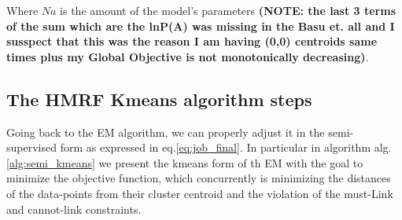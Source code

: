 \documentclass[dvips,dvipdfm,pdftex]{llncs}
\begin{document}
Where $\mathit{Na}$ is the amount of the model's parameters \textbf{(NOTE: the last 3 terms of the sum which are the lnP(A) was missing in the Basu et. all and I susspect that this was the reason I am having (0,0) centroids same times plus my Global Objective is not monotonically decreasing)}.

\subsection{The HMRF Kmeans algorithm steps}

Going back to the EM algorithm, we can properly adjust it in the semi-supervised form as expressed in eq.\ref{eq:job_final}. In particular in algorithm alg.\ref{alg:semi_kmeans} we present the kmeans form of th EM with the goal to minimize the objective function, which concurrently is minimizing the distances of the data-points from their cluster centroid and the violation of the must-Link and cannot-link constraints.
\end{document}
